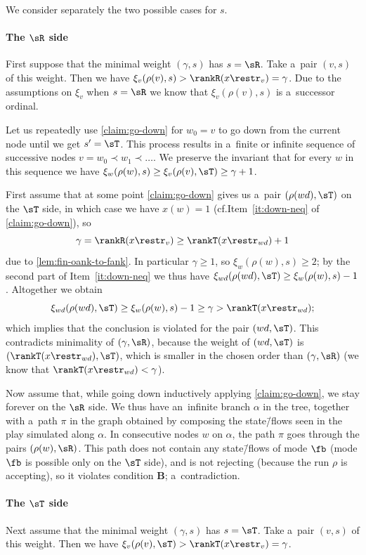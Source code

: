 \documentclass{lmcs}
\numberwithin{equation}{section}
\numberwithin{figure}{section}
\newcommand{\itemfont}[1]{\textbf{#1}}
\begin{document}
We consider separately the two possible cases for $s$.


\paragraph*{The $\sR$ side}
	First suppose that the minimal weight $(\gamma, s)$ has $s=\sR$.
	Take a~pair $(v,s)$ of this weight.
	Then we have $\xi_v(\rho(v),s)>\rankR(x\restr_v)=\gamma$.
	Due to the assumptions on $\xi_v$ when $s=\sR$ we know that $\xi_v(\rho(v),s)$ is a~successor ordinal.
	
	Let us repeatedly use \cref{claim:go-down} for $w_0=v$ to go down from the current node until we get $s'=\sT$.
	This process results in a~finite or infinite sequence of successive nodes $v=w_0\prec w_1\prec \ldots$.
	We preserve the invariant that for every $w$ in this sequence we have $\xi_{w}(\rho(w),s)\geq\xi_v(\rho(v),\sT)\geq\gamma+1$.
	
	First assume that at some point \cref{claim:go-down} gives us a~pair $(\rho(wd),\sT)$ on the $\sT$ side, in which case we have $x(w)=1$ (cf.\@ Item~\ref{it:down-neq} of \cref{claim:go-down}), so
	\[\gamma=\rankR(x\restr_v)\geq\rankT(x\restr_{wd})+1\]
	due to \cref{lem:fin-oank-to-fank}.
	In particular $\gamma\geq 1$, so $\xi_{w}(\rho(w),s)\geq 2$; by the second part of Item~\ref{it:down-neq} we thus have $\xi_{wd}(\rho(wd),\sT)\geq\xi_{w}(\rho(w),s)-1$.
	Altogether we obtain
	\[\xi_{wd}(\rho(wd),\sT)\geq\xi_{w}(\rho(w),s)-1\geq\gamma>\rankT(x\restr_{wd});\]
	which implies that the conclusion is violated for the pair $(wd, \sT)$.
	This contradicts minimality of $(\gamma,\sR)$, because the weight of $(wd, \sT)$ is $(\rankT(x\restr_{wd}),\sT)$, which is smaller in the chosen order than $(\gamma,\sR)$ (we know that $\rankT(x\restr_{wd})< \gamma$).
	
	Now assume that, while going down inductively applying \cref{claim:go-down}, we stay forever on the $\sR$ side.
	We thus have an~infinite branch $\alpha$ in the tree, together with a~path $\pi$ in the graph obtained by composing the state\=/flows seen in the play simulated along $\alpha$.
	In consecutive nodes $w$ on $\alpha$, the path $\pi$ goes through the pairs $(\rho(w),\sR)$.
	This path does not contain any state\=/flows of mode $\fb$ (mode $\fb$ is possible only on the $\sT$ side),
	and is not rejecting (because the run $\rho$ is accepting), so it violates condition \itemfont{B}; a~contradiction.
	

\paragraph*{The $\sT$ side}
	Next assume that the minimal weight $(\gamma, s)$ has $s=\sT$.
	Take a~pair $(v,s)$ of this weight.
	Then we have $\xi_v(\rho(v),\sT)>\rankT(x\restr_v)=\gamma$.
	
\end{document}
